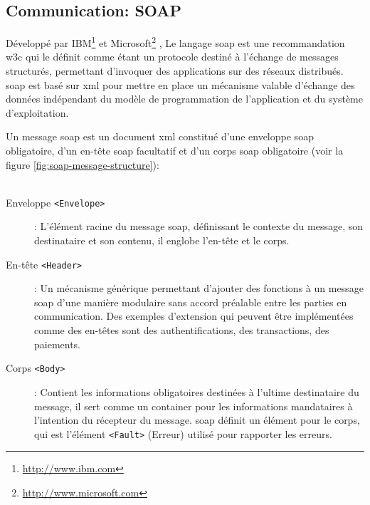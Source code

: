   \subsection{Communication: SOAP}
  \label{sec:soap}
  Développé par IBM\footnote{\url{http://www.ibm.com}} et
  Microsoft\footnote{\url{http://www.microsoft.com}}
  \cite{box2000simple}, Le langage \acrshort{soap} est une
  recommandation \acrshort{w3c} \cite{mitra2003soap} qui le définit
  comme étant un protocole destiné à l'échange de messages structurés,
  permettant d'invoquer des applications sur des réseaux
  distribués. \acrshort{soap} est basé sur \acrshort{xml} pour mettre
  en place un mécanisme valable d'échange des données indépendant du
  modèle de programmation de l'application et du système
  d'exploitation.

  Un message \acrshort{soap} est un document \acrshort{xml} constitué
  d'une enveloppe \acrshort{soap} obligatoire, d'un en-tête
  \acrshort{soap} facultatif et d'un corps \acrshort{soap} obligatoire
  (voir la figure \ref{fig:soap-message-structure}):\\\\

  

  \SpecialItem
  \renewcommand{\descriptionlabel}[1]{\hspace{1cm}\texttt{#1}}
  \begin{description}
  \item[Enveloppe \texttt{<Envelope>}]: L'élément racine du message
    \acrshort{soap}, définissant le contexte du message, son
    destinataire et son contenu, il englobe l'en-tête et le corps.

  \item[En-tête \texttt{<Header>}]: Un mécanisme générique permettant
    d'ajouter des fonctions à un message \acrshort{soap} d'une manière
    modulaire sans accord préalable entre les parties en
    communication.  Des exemples d'extension qui peuvent être
    implémentées comme des en-têtes sont des authentifications, des
    transactions, des paiements.

  \item[Corps \texttt{<Body>}]: Contient les informations obligatoires
    destinées à l'ultime destinataire du message, il sert comme un
    container pour les informations mandataires à l'intention du
    récepteur du message. \acrshort{soap} définit un élément pour le
    corps, qui est l'élément \texttt{<Fault>} (Erreur) utilisé pour
    rapporter les erreurs.
  \end{description}
  \enddescription

